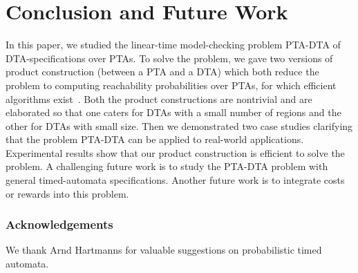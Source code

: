\section{Conclusion and Future Work}

In this paper, we studied the linear-time model-checking problem {\sc PTA-DTA} of DTA-specifications over PTAs.
To solve the problem, we gave two versions of product construction (between a PTA and a DTA) which both reduce the problem to computing reachability probabilities over PTAs, for which efficient algorithms exist~\cite{DBLP:journals/fmsd/NormanPS13,DBLP:journals/tcs/KwiatkowskaNSS02}.
Both the product constructions are nontrivial and are elaborated so that one caters for DTAs with a small number of regions and the other for DTAs with small size.
Then we demonstrated two case studies clarifying that the problem PTA-DTA can be applied to real-world applications.
Experimental results show that our product construction is efficient to solve the problem.
A challenging future work is to study the PTA-DTA problem with general timed-automata specifications.
Another future work is to integrate costs or rewards into this problem.
\subsubsection*{Acknowledgements} We thank Arnd Hartmanns for valuable suggestions on probabilistic timed automata.
